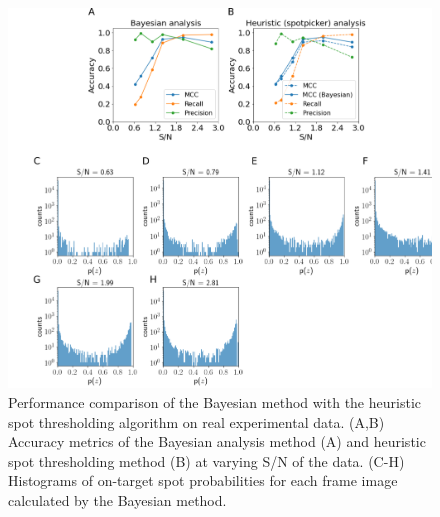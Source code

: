 \begin{figure}
\includegraphics[width=\linewidth]{figures/figure4/figure4.png}
\caption{Performance comparison of the Bayesian method with the heuristic spot thresholding algorithm on real experimental data. (A,B) Accuracy metrics of the Bayesian analysis method (A) and heuristic spot thresholding method (B) at varying S/N of the data. (C-H) Histograms of on-target spot probabilities for each frame image calculated by the Bayesian method.}
\label{fig:real_data}
\end{figure}

